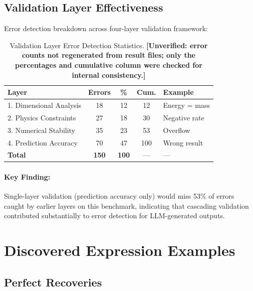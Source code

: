 \documentclass[twoside,11pt]{article}
\begin{document}
\clearpage
\subsection{Validation Layer Effectiveness}

Error detection breakdown across four-layer validation framework:

\begin{table}[H]
\centering
\caption{Validation Layer Error Detection Statistics.
  \textbf{[Unverified: error counts not regenerated from result files; only the
  percentages and cumulative column were checked for internal consistency.]}}
\label{tab:validation_stats}
\begin{tabular}{@{}lcccp{3cm}@{}}
\toprule
\textbf{Layer} & \textbf{Errors} & \textbf{\%} & \textbf{Cum.} & \textbf{Example} \\
\midrule
1. Dimensional Analysis & 18 & 12 & 12 & Energy = mass \\
2. Physics Constraints & 27 & 18 & 30 & Negative rate \\
3. Numerical Stability & 35 & 23 & 53 & Overflow \\
4. Prediction Accuracy & 70 & 47 & 100 & Wrong result \\
\midrule
\textbf{Total} & \textbf{150} & \textbf{100} & --- & --- \\
\bottomrule
\end{tabular}
\end{table}

\paragraph{Key Finding:} Single-layer validation (prediction accuracy only) would miss 53\% of errors caught by earlier layers on this benchmark, indicating that cascading validation contributed substantially to error detection for LLM-generated outputs.

\clearpage


\section{Discovered Expression Examples}
\label{app:expressions}

\subsection{Perfect Recoveries}
\end{document}
